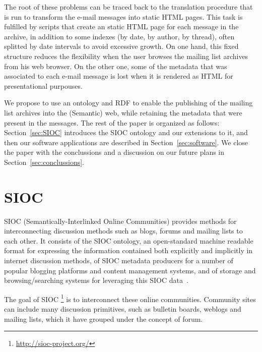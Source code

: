 \documentclass{llncs}
\begin{document}
The root of these problems can be traced back to the translation
procedure that is run to transform the e-mail messages into static
HTML pages. This task is fulfilled by scripts that create an
static HTML page for each message in the archive, in addition to
some indexes (by date, by author, by thread), often splitted by
date intervals to avoid excessive growth. On one hand, this fixed
structure reduces the flexibility when the user browses the
mailing list archives from his web browser. On the other one, some of
the metadata that was associated to each e-mail message is lost
when it is rendered as HTML for presentational purpouses.

We propose to use an ontology and RDF to enable the publishing of
the mailing list archives into the (Semantic) web, while retaining
the metadata that were present in the messages. The rest of the
paper is organized as follows: Section~\ref{sec:SIOC} introduces the
SIOC ontology and our extensions to it, and then our software
applications are described in Section~\ref{sec:software}. We close
the paper with the conclussions and a discussion on our future plans
in Section~\ref{sec:conclussions}.

\section{\label{sec:SIOC}SIOC}

SIOC (Semantically-Interlinked Online Communities) provides methods for 
interconnecting discussion methods such as blogs, forums and mailing lists 
to each other. It consists of the SIOC ontology, an open-standard machine 
readable format for expressing the information contained both explicitly 
and implicitly in internet discussion methods, of SIOC metadata producers 
for a number of popular blogging platforms and content management systems, 
and of storage and browsing/searching systems for leveraging this SIOC 
data~\cite{Breslin2005}.

The goal of SIOC \footnote{\url{http://sioc-project.org/}} is to interconnect
these online communities. Community sites can include many discussion primitives,
such as bulletin boards, weblogs and mailing lists, which it have grouped under 
the concept of forum.

\end{document}
